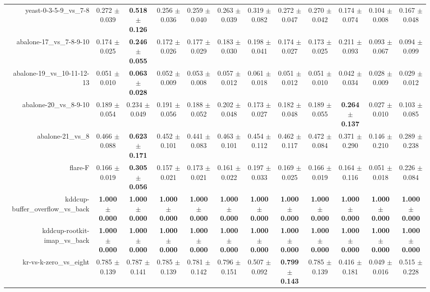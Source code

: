 \begin{table}[!ht]
{\begin{tabular}{r c c c c c c c c c c c}
yeast-0-3-5-9\_vs\_7-8 & 0.272 $\pm$ 0.039 & \textbf{0.518 $\pm$ 0.126} & 0.256 $\pm$ 0.036 & 0.259 $\pm$ 0.040 & 0.263 $\pm$ 0.039 & 0.319 $\pm$ 0.082 & 0.272 $\pm$ 0.047 & 0.270 $\pm$ 0.042 & 0.174 $\pm$ 0.074 & 0.104 $\pm$ 0.008 & 0.167 $\pm$ 0.048 \\
abalone-17\_vs\_7-8-9-10 & 0.174 $\pm$ 0.025 & \textbf{0.246 $\pm$ 0.055} & 0.172 $\pm$ 0.026 & 0.177 $\pm$ 0.029 & 0.183 $\pm$ 0.030 & 0.198 $\pm$ 0.041 & 0.174 $\pm$ 0.027 & 0.173 $\pm$ 0.025 & 0.211 $\pm$ 0.093 & 0.093 $\pm$ 0.067 & 0.094 $\pm$ 0.099 \\
abalone-19\_vs\_10-11-12-13 & 0.051 $\pm$ 0.010 & \textbf{0.063 $\pm$ 0.028} & 0.052 $\pm$ 0.009 & 0.053 $\pm$ 0.008 & 0.057 $\pm$ 0.012 & 0.061 $\pm$ 0.018 & 0.051 $\pm$ 0.012 & 0.051 $\pm$ 0.010 & 0.042 $\pm$ 0.034 & 0.028 $\pm$ 0.009 & 0.029 $\pm$ 0.012 \\
abalone-20\_vs\_8-9-10 & 0.189 $\pm$ 0.054 & 0.234 $\pm$ 0.049 & 0.191 $\pm$ 0.056 & 0.188 $\pm$ 0.052 & 0.202 $\pm$ 0.048 & 0.173 $\pm$ 0.027 & 0.182 $\pm$ 0.048 & 0.189 $\pm$ 0.055 & \textbf{0.264 $\pm$ 0.137} & 0.027 $\pm$ 0.010 & 0.103 $\pm$ 0.085 \\
abalone-21\_vs\_8 & 0.466 $\pm$ 0.088 & \textbf{0.623 $\pm$ 0.171} & 0.452 $\pm$ 0.101 & 0.441 $\pm$ 0.083 & 0.463 $\pm$ 0.101 & 0.454 $\pm$ 0.112 & 0.462 $\pm$ 0.117 & 0.472 $\pm$ 0.084 & 0.371 $\pm$ 0.290 & 0.146 $\pm$ 0.210 & 0.289 $\pm$ 0.238 \\
flare-F & 0.166 $\pm$ 0.019 & \textbf{0.305 $\pm$ 0.056} & 0.157 $\pm$ 0.021 & 0.173 $\pm$ 0.021 & 0.161 $\pm$ 0.022 & 0.197 $\pm$ 0.033 & 0.169 $\pm$ 0.025 & 0.166 $\pm$ 0.019 & 0.164 $\pm$ 0.116 & 0.051 $\pm$ 0.018 & 0.226 $\pm$ 0.084 \\
kddcup-buffer\_overflow\_vs\_back & \textbf{1.000 $\pm$ 0.000} & \textbf{1.000 $\pm$ 0.000} & \textbf{1.000 $\pm$ 0.000} & \textbf{1.000 $\pm$ 0.000} & \textbf{1.000 $\pm$ 0.000} & \textbf{1.000 $\pm$ 0.000} & \textbf{1.000 $\pm$ 0.000} & \textbf{1.000 $\pm$ 0.000} & \textbf{1.000 $\pm$ 0.000} & \textbf{1.000 $\pm$ 0.000} & \textbf{1.000 $\pm$ 0.000} \\
kddcup-rootkit-imap\_vs\_back & \textbf{1.000 $\pm$ 0.000} & \textbf{1.000 $\pm$ 0.000} & \textbf{1.000 $\pm$ 0.000} & \textbf{1.000 $\pm$ 0.000} & \textbf{1.000 $\pm$ 0.000} & \textbf{1.000 $\pm$ 0.000} & \textbf{1.000 $\pm$ 0.000} & \textbf{1.000 $\pm$ 0.000} & \textbf{1.000 $\pm$ 0.000} & \textbf{1.000 $\pm$ 0.000} & \textbf{1.000 $\pm$ 0.000} \\
kr-vs-k-zero\_vs\_eight & 0.785 $\pm$ 0.139 & 0.787 $\pm$ 0.141 & 0.785 $\pm$ 0.139 & 0.781 $\pm$ 0.142 & 0.796 $\pm$ 0.151 & 0.507 $\pm$ 0.092 & \textbf{0.799 $\pm$ 0.143} & 0.785 $\pm$ 0.139 & 0.416 $\pm$ 0.181 & 0.049 $\pm$ 0.016 & 0.515 $\pm$ 0.228 \\

\end{tabular}}
\end{table}

